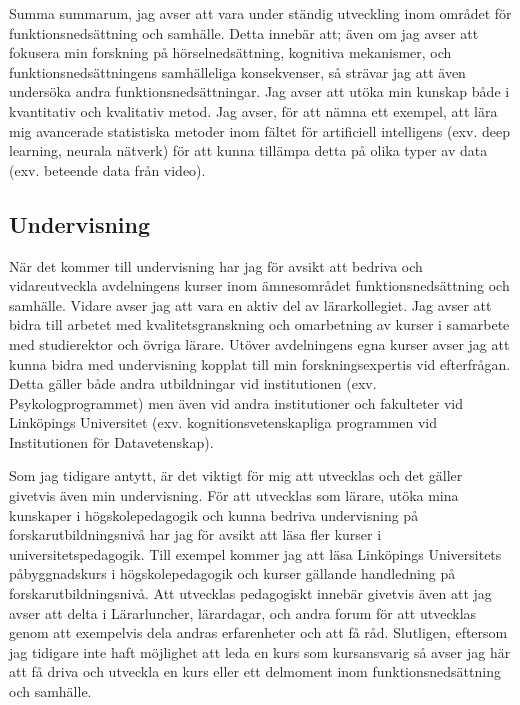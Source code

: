 \documentclass[]{article}
\begin{document}
\hfill\break
Summa summarum, jag avser att vara under ständig utveckling inom området
för funktionsnedsättning och samhälle. Detta innebär att; även om jag
avser att fokusera min forskning på hörselnedsättning, kognitiva
mekanismer, och funktionsnedsättningens samhälleliga konsekvenser, så
strävar jag att även undersöka andra funktionsnedsättningar. Jag avser
att utöka min kunskap både i kvantitativ och kvalitativ metod. Jag
avser, för att nämna ett exempel, att lära mig avancerade statistiska
metoder inom fältet för artificiell intelligens (exv. deep learning,
neurala nätverk) för att kunna tillämpa detta på olika typer av data
(exv. beteende data från video).

\hypertarget{undervisning}{%
\subsection{Undervisning}\label{undervisning}}

När det kommer till undervisning har jag för avsikt att bedriva och
vidareutveckla avdelningens kurser inom ämnesområdet
funktionsnedsättning och samhälle. Vidare avser jag att vara en aktiv
del av lärarkollegiet. Jag avser att bidra till arbetet med
kvalitetsgranskning och omarbetning av kurser i samarbete med
studierektor och övriga lärare. Utöver avdelningens egna kurser avser
jag att kunna bidra med undervisning kopplat till min forskningsexpertis
vid efterfrågan. Detta gäller både andra utbildningar vid institutionen
(exv. Psykologprogrammet) men även vid andra institutioner och
fakulteter vid Linköpings Universitet (exv. kognitionsvetenskapliga
programmen vid Institutionen för Datavetenskap).

\hfill\break
Som jag tidigare antytt, är det viktigt för mig att utvecklas och det
gäller givetvis även min undervisning. För att utvecklas som lärare,
utöka mina kunskaper i högskolepedagogik och kunna bedriva undervisning
på forskarutbildningsnivå har jag för avsikt att läsa fler kurser i
universitetspedagogik. Till exempel kommer jag att läsa Linköpings
Universitets påbyggnadskurs i högskolepedagogik och kurser gällande
handledning på forskarutbildningsnivå. Att utvecklas pedagogiskt innebär
givetvis även att jag avser att delta i Lärarluncher, lärardagar, och
andra forum för att utvecklas genom att exempelvis dela andras
erfarenheter och att få råd. Slutligen, eftersom jag tidigare inte haft
möjlighet att leda en kurs som kursansvarig så avser jag här att få
driva och utveckla en kurs eller ett delmoment inom funktionsnedsättning
och samhälle.
\end{document}
